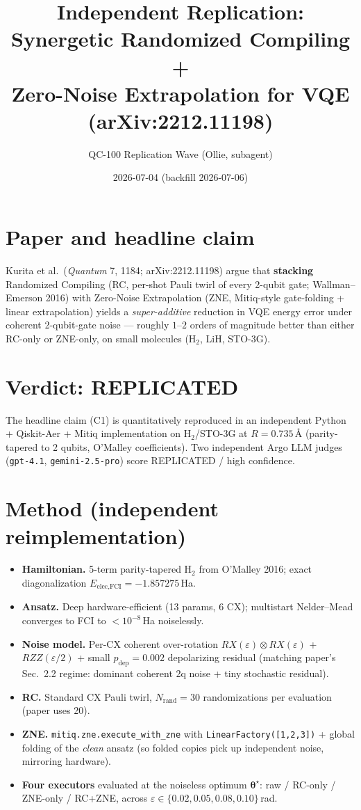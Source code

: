 \documentclass[11pt]{article}
\title{Independent Replication: Synergetic Randomized Compiling + \\
Zero-Noise Extrapolation for VQE (arXiv:2212.11198)}
\author{QC-100 Replication Wave (Ollie, subagent)}
\date{2026-07-04 (backfill 2026-07-06)}
\begin{document}
\maketitle

\section{Paper and headline claim}
Kurita et al.\ (\emph{Quantum} 7, 1184; arXiv:2212.11198) argue that
\textbf{stacking} Randomized Compiling (RC, per-shot Pauli twirl of every
2-qubit gate; Wallman--Emerson 2016) with Zero-Noise Extrapolation (ZNE, Mitiq-style
gate-folding + linear extrapolation) yields a \emph{super-additive} reduction in
VQE energy error under coherent 2-qubit-gate noise --- roughly $1$--$2$ orders of
magnitude better than either RC-only or ZNE-only, on small molecules
(H$_2$, LiH, STO-3G).

\section{Verdict: \textbf{REPLICATED}}
The headline claim (C1) is quantitatively reproduced in an independent Python
+ Qiskit-Aer + Mitiq implementation on H$_2$/STO-3G at $R=0.735$\,\AA{}
(parity-tapered to 2 qubits, O'Malley coefficients). Two independent Argo LLM
judges (\texttt{gpt-4.1}, \texttt{gemini-2.5-pro}) score REPLICATED / high
confidence.

\section{Method (independent reimplementation)}
\begin{itemize}
  \item \textbf{Hamiltonian.} 5-term parity-tapered H$_2$ from O'Malley 2016;
        exact diagonalization $E_{\text{elec,FCI}} = -1.857275$\,Ha.
  \item \textbf{Ansatz.} Deep hardware-efficient (13 params, 6 CX); multistart
        Nelder--Mead converges to FCI to $<10^{-8}$\,Ha noiselessly.
  \item \textbf{Noise model.} Per-CX coherent over-rotation
        $RX(\varepsilon)\otimes RX(\varepsilon)$ + $RZZ(\varepsilon/2)$ +
        small $p_{\text{dep}}=0.002$ depolarizing residual (matching paper's
        Sec.~2.2 regime: dominant coherent 2q noise + tiny stochastic residual).
  \item \textbf{RC.} Standard CX Pauli twirl, $N_{\text{rand}}=30$
        randomizations per evaluation (paper uses 20).
  \item \textbf{ZNE.} \texttt{mitiq.zne.execute\_with\_zne} with
        \texttt{LinearFactory([1,2,3])} + global folding of the \emph{clean}
        ansatz (so folded copies pick up independent noise, mirroring hardware).
  \item \textbf{Four executors} evaluated at the noiseless optimum
        $\boldsymbol{\theta}^\star$: raw / RC-only / ZNE-only / RC+ZNE, across
        $\varepsilon\in\{0.02,0.05,0.08,0.10\}$\,rad.
\end{itemize}
\end{document}
